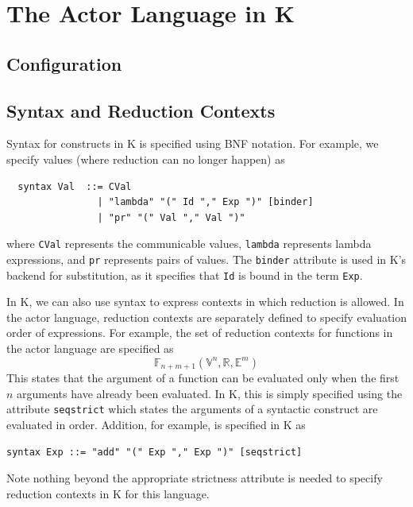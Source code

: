 \documentclass{llncs}
\begin{document}
\section{The Actor Language in K}

\subsection{Configuration}

\subsection{Syntax and Reduction Contexts}
Syntax for constructs in K is specified using BNF notation. For example, we
specify values (where reduction can no longer happen) as
\begin{verbatim}
  syntax Val  ::= CVal                                    
                | "lambda" "(" Id "," Exp ")" [binder]
                | "pr" "(" Val "," Val ")"
\end{verbatim}
where \texttt{CVal} represents the communicable values, \texttt{lambda}
represents lambda expressions, and \texttt{pr} represents pairs of values.  The
\texttt{binder} attribute is used in K's backend for substitution, as it
specifies that \texttt{Id} is bound in the term \texttt{Exp}.

In K, we can also use syntax to express contexts in which reduction is allowed.
In the actor language, reduction contexts are separately defined to specify
evaluation order of expressions. For example, the set of reduction contexts for
functions in the actor language are specified as
\[ \mathbb{F}_{n+m+1}(\mathbb{V}^n,\mathbb{R},\mathbb{E}^m) \]
This states that the argument of a function can be evaluated only when the first
$n$ arguments have already been evaluated. In K, this is simply specified using
the attribute \texttt{seqstrict} which states the arguments of a syntactic
construct are evaluated in order. Addition, for example, is specified in K as
\begin{verbatim}
syntax Exp ::= "add" "(" Exp "," Exp ")" [seqstrict]
\end{verbatim}
Note nothing beyond the appropriate strictness attribute is needed to specify
reduction contexts in K for this language.
\end{document}
